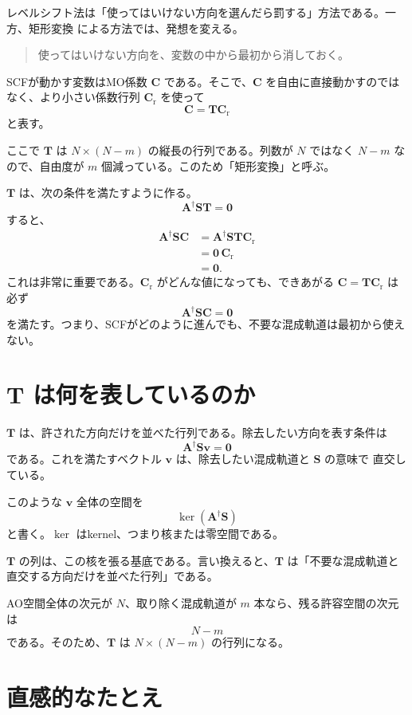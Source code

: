\documentclass[uplatex,dvipdfmx,11pt]{jsarticle}
\newcommand{\Smat}{\mathbf S}
\newcommand{\Amat}{\mathbf A}
\newcommand{\Tmat}{\mathbf T}
\newcommand{\Cmat}{\mathbf C}
\newcommand{\Cr}{\mathbf C_{\mathrm r}}
\begin{document}
レベルシフト法は「使ってはいけない方向を選んだら罰する」方法である。一方、矩形変換
による方法では、発想を変える。

\begin{quote}
使ってはいけない方向を、変数の中から最初から消しておく。
\end{quote}

SCFが動かす変数はMO係数 \(\Cmat\) である。そこで、\(\Cmat\) を自由に直接動かすのでは
なく、より小さい係数行列 \(\Cr\) を使って
\[
  \Cmat = \Tmat\Cr
\]
と表す。

ここで \(\Tmat\) は \(N\times(N-m)\) の縦長の行列である。列数が \(N\) ではなく
\(N-m\) なので、自由度が \(m\) 個減っている。このため「矩形変換」と呼ぶ。

\(\Tmat\) は、次の条件を満たすように作る。
\[
  \boxed{\Amat^\dagger\Smat\Tmat=\mathbf 0}
\]
すると、
\begin{align*}
  \Amat^\dagger\Smat\Cmat
  &=
  \Amat^\dagger\Smat\Tmat\Cr \\
  &=
  \mathbf 0\,\Cr \\
  &=
  \mathbf 0 .
\end{align*}
これは非常に重要である。\(\Cr\) がどんな値になっても、できあがる
\(\Cmat=\Tmat\Cr\) は必ず
\[
  \Amat^\dagger\Smat\Cmat=\mathbf 0
\]
を満たす。つまり、SCFがどのように進んでも、不要な混成軌道は最初から使えない。

\section{\(\Tmat\) は何を表しているのか}

\(\Tmat\) は、許された方向だけを並べた行列である。除去したい方向を表す条件は
\[
  \Amat^\dagger\Smat\mathbf v=\mathbf 0
\]
である。これを満たすベクトル \(\mathbf v\) は、除去したい混成軌道と \(\Smat\) の意味で
直交している。

このような \(\mathbf v\) 全体の空間を
\[
  \ker(\Amat^\dagger\Smat)
\]
と書く。\(\ker\) はkernel、つまり核または零空間である。

\(\Tmat\) の列は、この核を張る基底である。言い換えると、\(\Tmat\) は「不要な混成軌道と
直交する方向だけを並べた行列」である。

AO空間全体の次元が \(N\)、取り除く混成軌道が \(m\) 本なら、残る許容空間の次元は
\[
  N-m
\]
である。そのため、\(\Tmat\) は \(N\times(N-m)\) の行列になる。

\section{直感的なたとえ}
\end{document}
